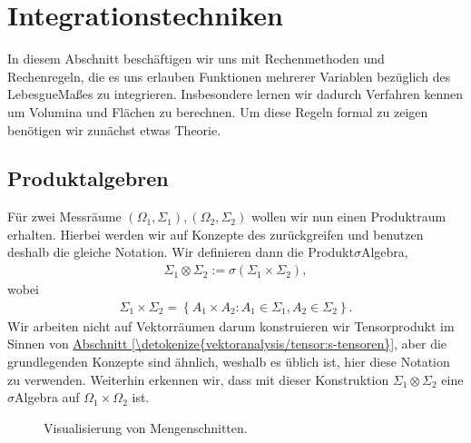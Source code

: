\documentclass[letterpaper,10pt,german]{jupyterBook}
\let\sphinxpxdimen\pdfpxdimen\else\newdimen\sphinxpxdimen
\begin{document}
\section{Integrationstechniken}
\label{\detokenize{masstheorie/integrationstechnik:integrationstechniken}}\label{\detokenize{masstheorie/integrationstechnik::doc}}
\sphinxAtStartPar
In diesem Abschnitt beschäftigen wir uns mit Rechenmethoden und Rechenregeln, die es uns erlauben Funktionen mehrerer Variablen bezüglich des Lebesgue\sphinxhyphen{}Maßes zu integrieren. Insbesondere lernen wir dadurch Verfahren kennen um Volumina und Flächen zu berechnen. Um diese Regeln formal zu zeigen benötigen wir zunächst etwas Theorie.


\subsection{Produktalgebren}
\label{\detokenize{masstheorie/integrationstechnik:produktalgebren}}
\sphinxAtStartPar
Für zwei Messräume \((\Omega_1,\Sigma_1), (\Omega_2,\Sigma_2)\) wollen wir nun einen Produktraum erhalten. Hierbei werden wir auf Konzepte des  zurückgreifen und benutzen deshalb die gleiche Notation. Wir definieren dann die Produkt\sphinxhyphen{}\(\sigma\)\sphinxhyphen{}Algebra,
\begin{equation*}
\begin{split}\Sigma_1\otimes\Sigma_2 := \sigma\left(\Sigma_1\times\Sigma_2\right),\end{split}
\end{equation*}
\sphinxAtStartPar
wobei
\begin{equation*}
\begin{split}\Sigma_1\times\Sigma_2 = \left\{A_1\times A_2: A_1\in\Sigma_1, A_2\in\Sigma_2\right\}.\end{split}
\end{equation*}
\sphinxAtStartPar
Wir arbeiten nicht auf Vektorräumen darum konstruieren wir  Tensorprodukt im Sinnen von \hyperref[\detokenize{vektoranalysis/tensor:s-tensoren}]{Abschnitt \ref{\detokenize{vektoranalysis/tensor:s-tensoren}}}, aber die grundlegenden Konzepte sind ähnlich, weshalb es üblich ist, hier diese Notation zu verwenden. Weiterhin erkennen wir, dass mit dieser Konstruktion \(\Sigma_1\otimes\Sigma_2 \) eine \(\sigma\)\sphinxhyphen{}Algebra auf \(\Omega_1\times\Omega_2\) ist.

\begin{figure}[htbp]
\centering
\capstart

\noindent\sphinxincludegraphics[width=600\sphinxpxdimen]{{schnitte}.jpg}
\caption{Visualisierung von Mengenschnitten.}\label{\detokenize{masstheorie/integrationstechnik:fig-schnitte}}\end{figure}
\end{document}
